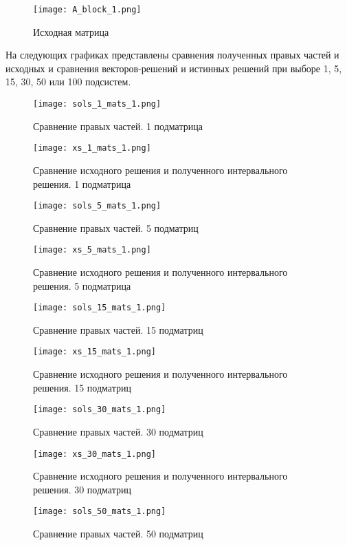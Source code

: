 \begin{figure}[h]
	\centering
	\texttt{[image: A\_block\_1.png]}
	\caption{Исходная матрица}
\end{figure}

На следующих графиках представлены сравнения полученных правых частей и исходных и сравнения векторов-решений и истинных решений при выборе 1, 5, 15, 30, 50 или 100 подсистем.
\newpage
\begin{figure}[h]
	\centering
	\texttt{[image: sols\_1\_mats\_1.png]}
	\caption{Сравнение правых частей. 1 подматрица}
\end{figure}

\begin{figure}[h]
	\centering
	\texttt{[image: xs\_1\_mats\_1.png]}
	\caption{Сравнение исходного решения и полученного интервального решения. 1 подматрица}
\end{figure}
\newpage
\begin{figure}[h]
	\centering
	\texttt{[image: sols\_5\_mats\_1.png]}
	\caption{Сравнение правых частей. 5 подматриц}
\end{figure}

\begin{figure}[h]
	\centering
	\texttt{[image: xs\_5\_mats\_1.png]}
	\caption{Сравнение исходного решения и полученного интервального решения. 5 подматрица}
\end{figure}
\newpage
\begin{figure}[h]
	\centering
	\texttt{[image: sols\_15\_mats\_1.png]}
	\caption{Сравнение правых частей. 15 подматриц}
\end{figure}

\begin{figure}[h]
	\centering
	\texttt{[image: xs\_15\_mats\_1.png]}
	\caption{Сравнение исходного решения и полученного интервального решения. 15 подматриц}
\end{figure}
\newpage
\begin{figure}[h]
	\centering
	\texttt{[image: sols\_30\_mats\_1.png]}
	\caption{Сравнение правых частей. 30 подматриц}
\end{figure}

\begin{figure}[h]
	\centering
	\texttt{[image: xs\_30\_mats\_1.png]}
	\caption{Сравнение исходного решения и полученного интервального решения. 30 подматриц}
\end{figure}
\newpage
\begin{figure}[h]
	\centering
	\texttt{[image: sols\_50\_mats\_1.png]}
	\caption{Сравнение правых частей. 50 подматриц}
\end{figure}

